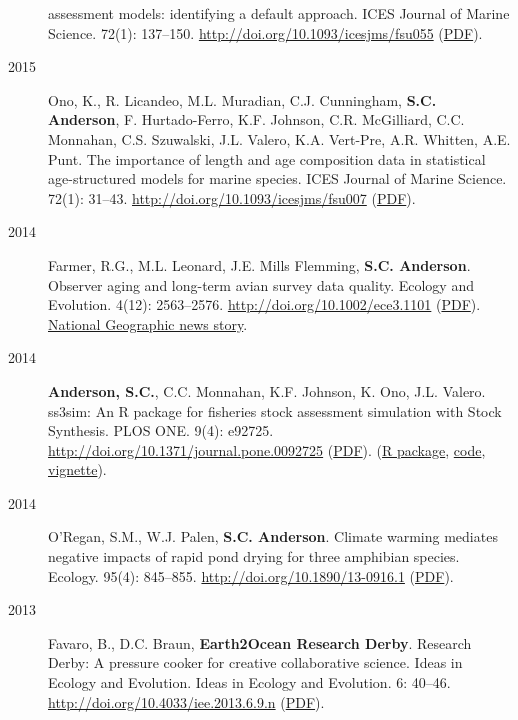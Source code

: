\begin{description}
assessment models: identifying a default approach. ICES Journal of
Marine Science. 72(1): 137--150.
\url{http://doi.org/10.1093/icesjms/fsu055}
(\href{http://icesjms.oxfordjournals.org/content/early/2014/04/09/icesjms.fsu055.full.pdf?keytype=ref\&ijkey=NEXmZIkz3289u3z}{PDF}).
\item[2015]
Ono, K., R. Licandeo, M.L. Muradian, C.J. Cunningham, \textbf{S.C.
Anderson}, F. Hurtado-Ferro, K.F. Johnson, C.R. McGilliard, C.C.
Monnahan, C.S. Szuwalski, J.L. Valero, K.A. Vert-Pre, A.R. Whitten, A.E.
Punt. The importance of length and age composition data in statistical
age-structured models for marine species. ICES Journal of Marine
Science. 72(1): 31--43. \url{http://doi.org/10.1093/icesjms/fsu007}
(\href{http://icesjms.oxfordjournals.org/content/early/2014/02/20/icesjms.fsu007.full.pdf}{PDF}).
\item[2014]
Farmer, R.G., M.L. Leonard, J.E. Mills Flemming, \textbf{S.C. Anderson}.
Observer aging and long-term avian survey data quality. Ecology and
Evolution. 4(12): 2563--2576. \url{http://doi.org/10.1002/ece3.1101}
(\href{http://onlinelibrary.wiley.com/doi/10.1002/ece3.1101/pdf}{PDF}).
\href{http://news.nationalgeographic.com/news/2014/08/140805-aging-birders-breeding-bird-survey-volunteers-science/}{National
Geographic news story}.
\item[2014]
\textbf{Anderson, S.C.}, C.C. Monnahan, K.F. Johnson, K. Ono, J.L.
Valero. ss3sim: An R package for fisheries stock assessment simulation
with Stock Synthesis. PLOS ONE. 9(4): e92725.
\url{http://doi.org/10.1371/journal.pone.0092725}
(\href{http://www.plosone.org/article/fetchObject.action?uri=info\%3Adoi\%2F10.1371\%2Fjournal.pone.0092725\&representation=PDF}{PDF}).
(\href{http://cran.r-project.org/web/packages/ss3sim/index.html}{R
package}, \href{https://github.com/ss3sim/ss3sim}{code},
\href{https://dl.dropboxusercontent.com/u/254940/ss3sim-vignette.pdf}{vignette}).
\item[2014]
O'Regan, S.M., W.J. Palen, \textbf{S.C. Anderson}. Climate warming
mediates negative impacts of rapid pond drying for three amphibian
species. Ecology. 95(4): 845--855.
\url{http://doi.org/10.1890/13-0916.1}
(\href{http://www.esajournals.org/doi/pdf/10.1890/13-0916.1}{PDF}).
\item[2013]
Favaro, B., D.C. Braun, \textbf{Earth2Ocean Research Derby}. Research
Derby: A pressure cooker for creative collaborative science. Ideas in
Ecology and Evolution. Ideas in Ecology and Evolution. 6: 40--46.
\url{http://doi.org/10.4033/iee.2013.6.9.n}
(\href{http://library.queensu.ca/ojs/index.php/IEE/article/download/4931/4899}{PDF}).

\end{description}
